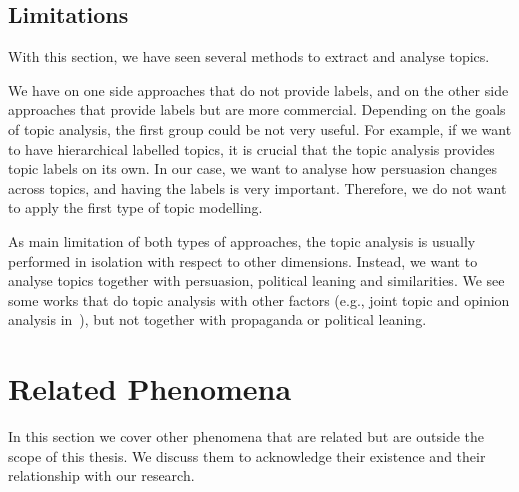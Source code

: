 


\subsection{\statusgreen Limitations}

With this section, we have seen several methods to extract and analyse topics.

We have on one side approaches that do not provide labels, and on the other side approaches that provide labels but are more commercial.
Depending on the goals of topic analysis, the first group could be not very useful. For example, if we want to have hierarchical labelled topics, it is crucial that the topic analysis provides topic labels on its own.
In our case, we want to analyse how persuasion changes across topics, and having the labels is very important. Therefore, we do not want to apply the first type of topic modelling.

As main limitation of both types of approaches, the topic analysis is usually performed in isolation with respect to other dimensions.
Instead, we want to analyse topics together with persuasion, political leaning and similarities.
We see some works that do topic analysis with other factors (e.g., joint topic and opinion analysis in~\citet{stoyanov2008topic}), but not together with propaganda or political leaning.

\section{\statusgreen Related Phenomena}
\label{sec:lit_related}

In this section we cover other phenomena that are related but are outside the scope of this thesis.
We discuss them to acknowledge their existence and their relationship with our research.


